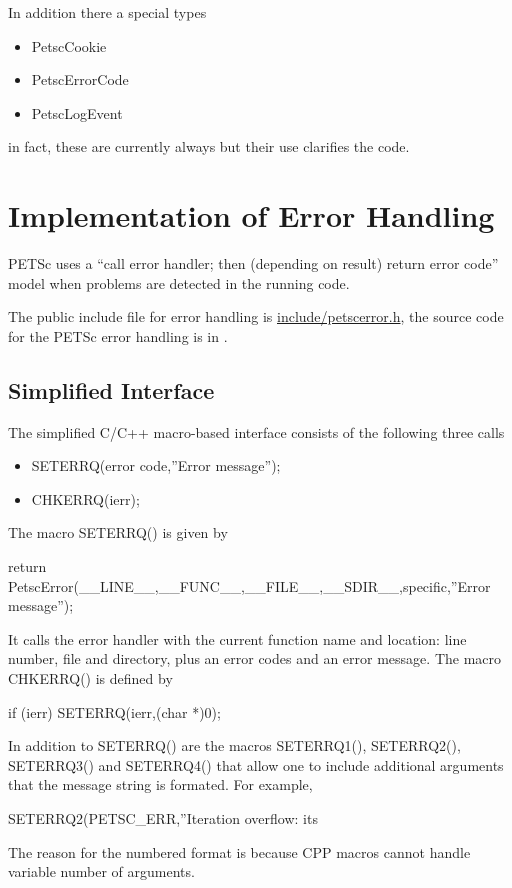 \documentclass[twoside,12pt]{../sty/report_petsc}
\begin{document}
In addition there a special types
\begin{itemize}
  \item PetscCookie
  \item PetscErrorCode
  \item PetscLogEvent
\end{itemize}
in fact, these are currently always  but their use clarifies the code.

\section{Implementation of Error Handling}

PETSc  uses a ``call error handler; then (depending on result) return
error code'' model when problems are detected in the running code. 

The public include file for error handling is
 \href{http://www.mcs.anl.gov/petsc/petsc-as/snapshots/petsc-dev/include/petscerror.h.html}{include/petscerror.h}, the 
source code for the PETSc error handling is in  
.

\subsection{Simplified Interface}

The simplified C/C++ macro-based interface consists of the following three calls
\begin{itemize}
\item SETERRQ(error code,''Error message'');
\item CHKERRQ(ierr);
\end{itemize}

The macro SETERRQ() is given by 
\begin{tabbing}
return PetscError(\_\_LINE\_\_,\_\_FUNC\_\_,\_\_FILE\_\_,\_\_SDIR\_\_,specific,''Error message'');
\end{tabbing}
It calls the error handler with the current function name and location: line number,
file and directory, plus an error codes and an error message.
The macro CHKERRQ() is defined by
\begin{tabbing}
  if (ierr) SETERRQ(ierr,(char *)0);
\end{tabbing}

In addition to SETERRQ() are the macros SETERRQ1(), SETERRQ2(), SETERRQ3()
and SETERRQ4() that allow one to include additional arguments that the message
string is formated. For example,
\begin{tabbing}
  SETERRQ2(PETSC\_ERR,''Iteration overflow: its %
\end{tabbing}
The reason for the numbered format is because CPP macros cannot handle variable number
of arguments.
 
\end{document}
